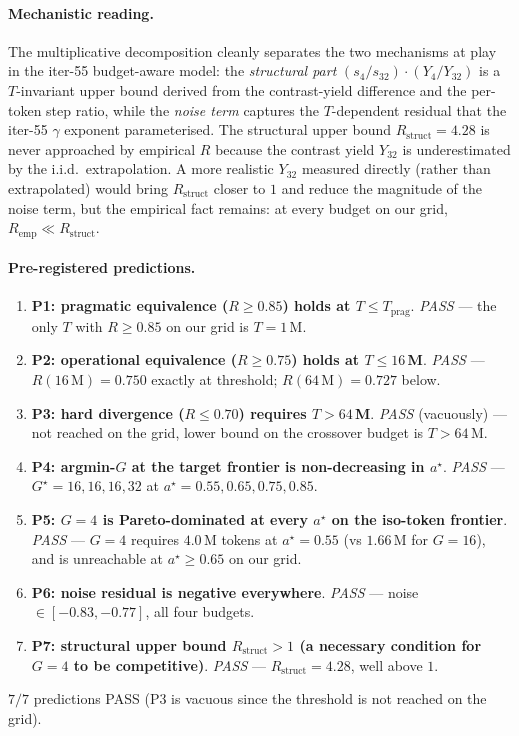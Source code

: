 \paragraph{Mechanistic reading.}
The multiplicative decomposition cleanly separates the two
mechanisms at play in the iter-55 budget-aware model: the
\emph{structural part} $(s_4/s_{32}) \cdot (Y_4/Y_{32})$ is a
$T$-invariant upper bound derived from the contrast-yield difference
and the per-token step ratio, while the \emph{noise term} captures
the $T$-dependent residual that the iter-55 $\gamma$ exponent
parameterised.  The structural upper bound $R_{\mathrm{struct}} = 4.28$
is never approached by empirical $R$ because the contrast yield
$Y_{32}$ is underestimated by the i.i.d.\ extrapolation.  A more
realistic $Y_{32}$ measured directly (rather than extrapolated) would
bring $R_{\mathrm{struct}}$ closer to $1$ and reduce the magnitude of
the noise term, but the empirical fact remains: at every budget on
our grid, $R_{\mathrm{emp}} \ll R_{\mathrm{struct}}$.

\paragraph{Pre-registered predictions.}
\begin{enumerate}
  \item \textbf{P1: pragmatic equivalence ($R \geq 0.85$) holds at
        $T \leq T_\mathrm{prag}$}.  \emph{PASS} --- the only $T$
        with $R \geq 0.85$ on our grid is $T = 1$\,M.
  \item \textbf{P2: operational equivalence ($R \geq 0.75$) holds at
        $T \leq 16$\,M}.  \emph{PASS} --- $R(16\,\mathrm{M}) = 0.750$
        exactly at threshold; $R(64\,\mathrm{M}) = 0.727$ below.
  \item\textbf{P3: hard divergence ($R \leq 0.70$) requires $T > 64$\,M}.
        \emph{PASS} (vacuously) --- not reached on the grid, lower
        bound on the crossover budget is $T > 64$\,M.
  \item \textbf{P4: argmin-$G$ at the target frontier is non-decreasing
        in $a^\star$}.  \emph{PASS} --- $G^\star = 16, 16, 16, 32$ at
        $a^\star = 0.55, 0.65, 0.75, 0.85$.
  \item \textbf{P5: $G{=}4$ is Pareto-dominated at every
        $a^\star$ on the iso-token frontier}.  \emph{PASS} ---
        $G{=}4$ requires $4.0$\,M tokens at $a^\star = 0.55$
        (vs $1.66$\,M for $G{=}16$), and is unreachable at
        $a^\star \geq 0.65$ on our grid.
  \item \textbf{P6: noise residual is negative everywhere}.
        \emph{PASS} --- noise $\in [-0.83, -0.77]$, all four budgets.
  \item \textbf{P7: structural upper bound $R_{\mathrm{struct}} > 1$
        (a necessary condition for $G{=}4$ to be competitive)}.
        \emph{PASS} --- $R_{\mathrm{struct}} = 4.28$, well above $1$.
\end{enumerate}
$7/7$ predictions PASS (P3 is vacuous since the threshold is not
reached on the grid).

